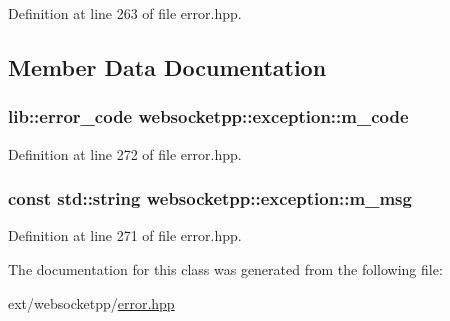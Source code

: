 Definition at line 263 of file error.\+hpp.



\subsection{Member Data Documentation}
\hypertarget{classwebsocketpp_1_1exception_ab34949df4a66b0ac7c3f2928364c85c7}{}
\subsubsection[{m\+\_\+code}]{\setlength{\rightskip}{0pt plus 5cm}lib\+::error\+\_\+code websocketpp\+::exception\+::m\+\_\+code}\label{classwebsocketpp_1_1exception_ab34949df4a66b0ac7c3f2928364c85c7}


Definition at line 272 of file error.\+hpp.

\hypertarget{classwebsocketpp_1_1exception_a6a739f94138be314aaac2ef3b5e5b467}{}
\subsubsection[{m\+\_\+msg}]{\setlength{\rightskip}{0pt plus 5cm}const std\+::string websocketpp\+::exception\+::m\+\_\+msg}\label{classwebsocketpp_1_1exception_a6a739f94138be314aaac2ef3b5e5b467}


Definition at line 271 of file error.\+hpp.



The documentation for this class was generated from the following file\+:\begin{DoxyCompactItemize}
\item 
ext/websocketpp/\hyperlink{websocketpp_2error_8hpp}{error.\+hpp}\end{DoxyCompactItemize}
